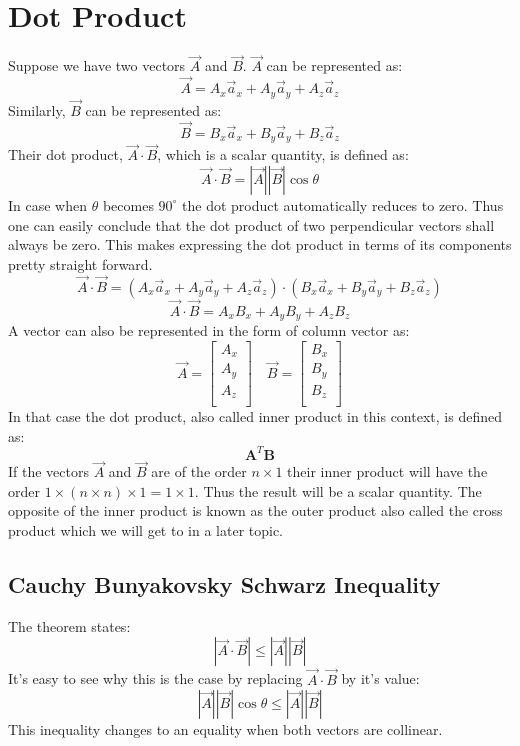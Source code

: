     \section{Dot Product}
        Suppose we have two vectors $\vec{A}$ and $\vec{B}$. $\vec{A}$ can be represented as:
        $$\vec{A} = A_x\vec{a}_x + A_y\vec{a}_y + A_z\vec{a}_z$$
        Similarly, $\vec{B}$ can be represented as:
        $$\vec{B} = B_x\vec{a}_x + B_y\vec{a}_y + B_z\vec{a}_z$$
        Their dot product, $\vec{A}\cdot \vec{B}$, which is a scalar quantity, is defined as:
        \begin{equation}\label{eq:dotproductfirst}
            \vec{A}\cdot \vec{B} = |\vec{A}||\vec{B}|\cos \theta
        \end{equation}
        In case when $\theta$ becomes $90^{\circ}$ the dot product automatically reduces to zero. Thus one can easily conclude that the dot product of two perpendicular vectors shall always be zero. This makes expressing the dot product in terms of its components pretty straight forward.
        $$\vec{A}\cdot \vec{B} = \left(A_x\vec{a}_x + A_y\vec{a}_y + A_z\vec{a}_z\right)\cdot \left(B_x\vec{a}_x + B_y\vec{a}_y + B_z\vec{a}_z\right)$$
        \begin{equation}\label{eq:dotproduct}
           \vec{A}\cdot \vec{B} = A_xB_x + A_yB_y + A_zB_z
        \end{equation}
        A vector can also be represented in the form of column vector as:
        $$ \vec{A} = \begin{bmatrix}A_x \\A_y \\A_z\\ \end{bmatrix} \quad \vec{B} = \begin{bmatrix}B_x \\B_y \\B_z\\ \end{bmatrix} $$
        In that case the dot product, also called inner product in this context, is defined as:
        $$ \mathbf{A}^{T}\mathbf{B} $$
        If the vectors $\vec{A}$ and $\vec{B}$ are of the order $n \times 1$ their inner product will have the order $ 1 \times \left(n \times n\right) \times 1 = 1 \times 1$. Thus the result will be a scalar quantity.
        The opposite of the inner product is known as the outer product also called the cross product which we will get to in a later topic.
        
        \subsection{Cauchy Bunyakovsky Schwarz Inequality}
            The theorem states:
            $$|\vec{A}\cdot \vec{B}| \leq |\vec{A}||\vec{B}|$$
            It's easy to see why this is the case by replacing $\vec{A}\cdot \vec{B}$ by it's value:
            $$|\vec{A}||\vec{B}|\cos \theta \leq |\vec{A}||\vec{B}| $$
            This inequality changes to an equality when both vectors are collinear.
        
